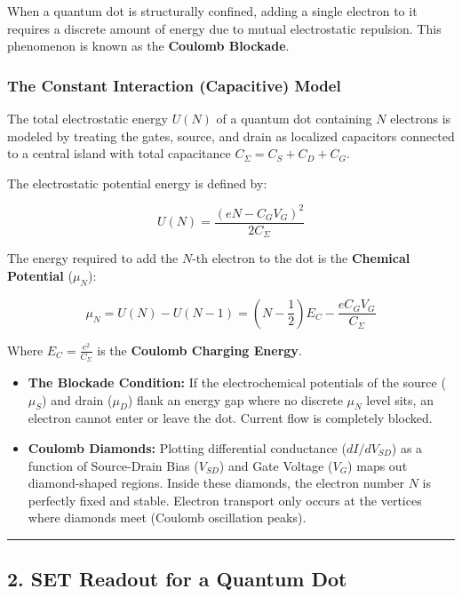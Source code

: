\documentclass[
]{article}
\providecommand{\tightlist}{%
  \setlength{\itemsep}{0pt}\setlength{\parskip}{0pt}}
\begin{document}
When a quantum dot is structurally confined, adding a single electron to
it requires a discrete amount of energy due to mutual electrostatic
repulsion. This phenomenon is known as the \textbf{Coulomb Blockade}.

\subsubsection{The Constant Interaction (Capacitive)
Model}\label{the-constant-interaction-capacitive-model}

The total electrostatic energy \(U(N)\) of a quantum dot containing
\(N\) electrons is modeled by treating the gates, source, and drain as
localized capacitors connected to a central island with total
capacitance \(C_{\Sigma} = C_S + C_D + C_G\).

The electrostatic potential energy is defined by:

\[U(N) = \frac{(eN - C_G V_G)^2}{2C_{\Sigma}}\]

The energy required to add the \(N\)-th electron to the dot is the
\textbf{Chemical Potential} (\(\mu_N\)):

\[\mu_N = U(N) - U(N-1) = \left(N - \frac{1}{2}\right)E_C - \frac{e C_G V_G}{C_{\Sigma}}\]

Where \(E_C = \frac{e^2}{C_{\Sigma}}\) is the \textbf{Coulomb Charging
Energy}.

\begin{itemize}
\tightlist
\item
  \textbf{The Blockade Condition:} If the electrochemical potentials of
  the source (\(\mu_S\)) and drain (\(\mu_D\)) flank an energy gap where
  no discrete \(\mu_N\) level sits, an electron cannot enter or leave
  the dot. Current flow is completely blocked.
\item
  \textbf{Coulomb Diamonds:} Plotting differential conductance
  (\(dI/dV_{SD}\)) as a function of Source-Drain Bias (\(V_{SD}\)) and
  Gate Voltage (\(V_G\)) maps out diamond-shaped regions. Inside these
  diamonds, the electron number \(N\) is perfectly fixed and stable.
  Electron transport only occurs at the vertices where diamonds meet
  (Coulomb oscillation peaks).
\end{itemize}

\begin{center}\rule{0.5\linewidth}{0.5pt}\end{center}

\subsection{2. SET Readout for a Quantum
Dot}\label{set-readout-for-a-quantum-dot}
\end{document}
